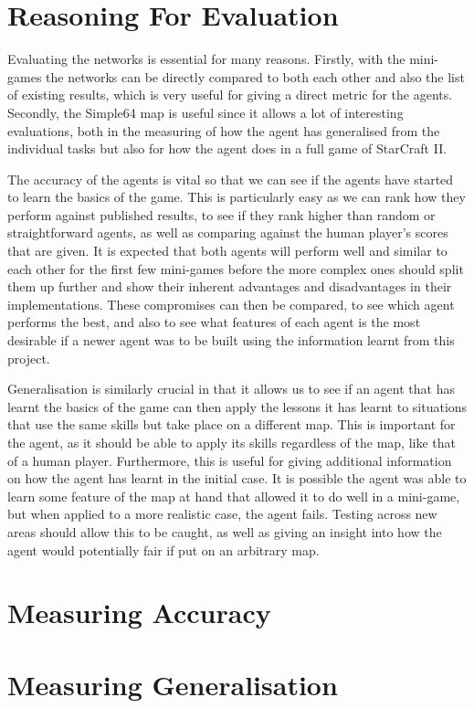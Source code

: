 \section{Reasoning For Evaluation}

Evaluating the networks is essential for many reasons. Firstly, with the
mini-games the networks can be directly compared to both each other and also the
list of existing results, which is very useful for giving a direct metric for
the agents. Secondly, the Simple64 map is useful since it allows a lot of
interesting evaluations, both in the measuring of how the agent has generalised
from the individual tasks but also for how the agent does in a full game of
StarCraft II\@.

The accuracy of the agents is vital so that we can see if the agents have
started to learn the basics of the game. This is particularly easy as we can
rank how they perform against published results, to see if they rank higher than
random or straightforward agents, as well as comparing against the human
player's scores that are given. It is expected that both agents will perform
well and similar to each other for the first few mini-games before the more
complex ones should split them up further and show their inherent advantages and
disadvantages in their implementations. These compromises can then be compared,
to see which agent performs the best, and also to see what features of each
agent is the most desirable if a newer agent was to be built using the
information learnt from this project.

Generalisation is similarly crucial in that it allows us to see if an agent that
has learnt the basics of the game can then apply the lessons it has learnt to
situations that use the same skills but take place on a different map. This is
important for the agent, as it should be able to apply its skills regardless of
the map, like that of a human player. Furthermore, this is useful for giving
additional information on how the agent has learnt in the initial case. It is
possible the agent was able to learn some feature of the map at hand that
allowed it to do well in a mini-game, but when applied to a more realistic case,
the agent fails. Testing across new areas should allow this to be caught, as
well as giving an insight into how the agent would potentially fair if put on an
arbitrary map.

\section{Measuring Accuracy}

\section{Measuring Generalisation}

